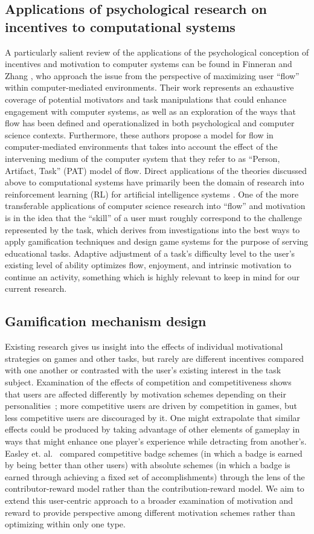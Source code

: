 \subsection{Applications of psychological research on incentives to computational systems}
A particularly salient review of the applications of the psychological conception of incentives and motivation to computer systems can be found in Finneran and Zhang \cite{Finneran05}, who approach the issue from the perspective of maximizing user “flow” within computer-mediated environments. Their work represents an exhaustive coverage of potential motivators and task manipulations that could enhance engagement with computer systems, as well as an exploration of the ways that flow has been defined and operationalized in both psychological and computer science contexts. Furthermore, these authors propose a model for flow in computer-mediated environments that takes into account the effect of the intervening medium of the computer system that they refer to as “Person, Artifact, Task” (PAT) model of flow. 
	Direct applications of the theories discussed above to computational systems have primarily been the domain of research into reinforcement learning (RL) for artificial intelligence systems \cite{cite}. 
One of the more transferable applications of computer science research into “flow” and motivation is in the idea that the “skill” of a user must roughly correspond to the challenge represented by the task\cite{cite}, which derives from investigations into the best ways to apply gamification techniques and design game systems for the purpose of serving educational tasks. Adaptive adjustment of a task’s difficulty level to the user’s existing level of ability optimizes flow, enjoyment, and intrinsic motivation to continue an activity, something which is highly relevant to keep in mind for our current research.

\subsection{Gamification mechanism design}
Existing research gives us insight into the effects of individual motivational strategies on games and other tasks, but rarely are different incentives compared with one another or contrasted with the user's existing interest in the task subject. Examination of the effects of competition and competitiveness shows that users are affected differently by motivation schemes depending on their personalities~\cite{Song13}; more competitive users are driven by competition in games, but less competitive users are discouraged by it. One might extrapolate that similar effects could be produced by taking advantage of other elements of gameplay in ways that might enhance one player's experience while detracting from another's. Easley et. al.~\cite{Easley13} compared competitive badge schemes (in which a badge is earned by being better than other users) with absolute schemes (in which a badge is earned through achieving a fixed set of accomplishments) through the lens of the contributor-reward model rather than the contribution-reward model. We aim to extend this user-centric approach to a broader examination of motivation and reward to provide perspective among different motivation schemes rather than optimizing within only one type.